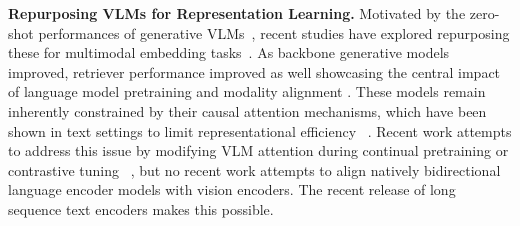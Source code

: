 \noindent\textbf{Repurposing VLMs for Representation Learning.}  
Motivated by the zero-shot performances of generative VLMs~, recent studies have explored repurposing these for multimodal embedding tasks~. As backbone generative models improved, retriever performance improved as well showcasing the central impact of language model pretraining and modality alignment . 
These models remain inherently constrained by their causal attention mechanisms, which have been shown in text settings to limit representational efficiency ~. Recent work attempts to address this issue by modifying VLM attention during continual pretraining  or contrastive tuning ~, but no recent work attempts to align natively bidirectional language encoder models with vision encoders. The recent release of long sequence text encoders  makes this possible.

